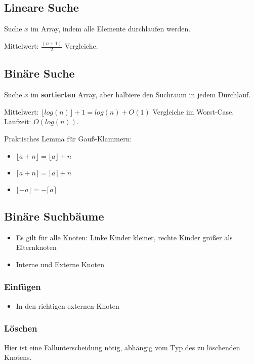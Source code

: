\documentclass[11pt]{scrartcl}
\begin{document}
\subsection{Lineare Suche}
Suche $x$ im Array, indem alle Elemente durchlaufen werden.

Mittelwert: $\frac{(n+1)}{2}$ Vergleiche.

\subsection{Binäre Suche}
Suche $x$ im \textbf{sortierten} Array, aber halbiere den Suchraum in jedem Durchlauf.

Mittelwert: $\lfloor log(n) \rfloor+1=log(n)+O(1)$ Vergleiche im Worst-Case. \\
Laufzeit: $O(log(n))$.

Praktisches Lemma für Gauß-Klammern:
\begin{itemize}
	\item $\lfloor a+n \rfloor=\lfloor a \rfloor+n$
    \item $\lceil a+n \rceil=\lceil a \rceil+n$
    \item $\lfloor -a \rfloor=-\lceil a \rceil$
\end{itemize}

\subsection{Binäre Suchbäume}

\begin{itemize}
    \item Es gilt für alle Knoten: Linke Kinder kleiner, rechte Kinder größer als Elternknoten
    \item Interne und Externe Knoten
\end{itemize}

\subsubsection{Einfügen}

\begin{itemize}
	\item In den richtigen externen Knoten
\end{itemize}

\subsubsection{Löschen}

Hier ist eine Fallunterscheidung nötig, abhängig vom Typ des zu löschenden Knotens.
\end{document}
